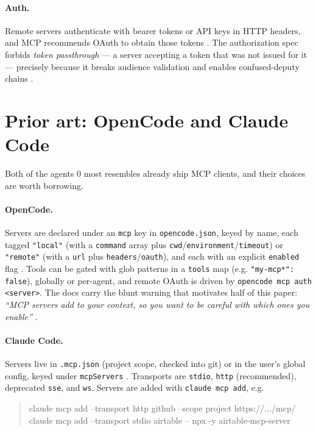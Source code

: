 \documentclass[11pt]{article}
\begin{document}
\paragraph{Auth.} Remote servers authenticate with bearer tokens or API keys in
HTTP headers, and MCP recommends OAuth to obtain those tokens
\cite{mcp-arch,mcp-security}. The authorization spec forbids
\emph{token passthrough} --- a server accepting a token that was not issued for
it --- precisely because it breaks audience validation and enables confused-deputy
chains \cite{mcp-security}.

\section{Prior art: OpenCode and Claude Code}

Both of the agents 0 most resembles already ship MCP clients, and their
choices are worth borrowing.

\paragraph{OpenCode.} Servers are declared under an \texttt{mcp} key in
\texttt{opencode.json}, keyed by name, each tagged \texttt{"local"} (with a
\texttt{command} array plus \texttt{cwd}/\texttt{environment}/\texttt{timeout}) or
\texttt{"remote"} (with a \texttt{url} plus \texttt{headers}/\texttt{oauth}), and
each with an explicit \texttt{enabled} flag \cite{opencode-mcp}. Tools can be
gated with glob patterns in a \texttt{tools} map (e.g. \texttt{"my-mcp*": false}),
globally or per-agent, and remote OAuth is driven by
\texttt{opencode mcp auth <server>}. The docs carry the blunt warning that
motivates half of this paper: \emph{``MCP servers add to your context, so you
want to be careful with which ones you enable''} \cite{opencode-mcp}.

\paragraph{Claude Code.} Servers live in \texttt{.mcp.json} (project scope,
checked into git) or in the user's global config, keyed under
\texttt{mcpServers} \cite{claudecode-mcp}. Transports are \texttt{stdio},
\texttt{http} (recommended), deprecated \texttt{sse}, and \texttt{ws}. Servers
are added with \texttt{claude mcp add}, e.g.

\begin{quote}
\ttfamily
claude mcp add --transport http github --scope project https://.../mcp/\\
claude mcp add --transport stdio airtable -- npx -y airtable-mcp-server
\end{quote}
\end{document}

